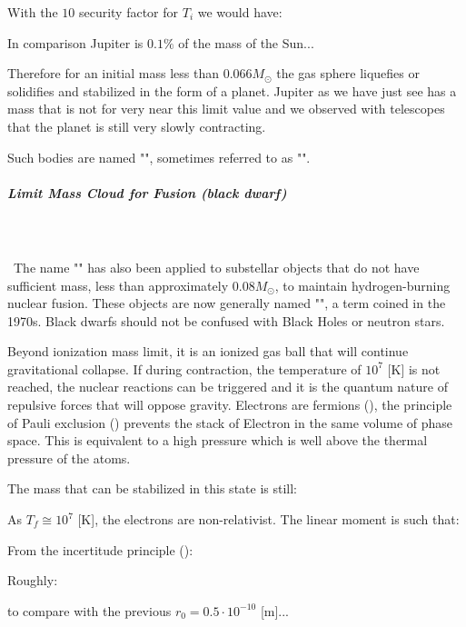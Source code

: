 	With the $10$ security factor for $T_i$ we would have:
	
	In comparison Jupiter is $0.1\%$ of the mass of the Sun...
	
	Therefore for an initial mass less than $0.066 M_\odot $ the gas sphere liquefies or solidifies and stabilized in the form of a planet. Jupiter as we have just see has a mass that is not for very near this limit value and we observed with telescopes that the planet is still very slowly contracting. 
	
	Such bodies are named "", sometimes referred to as "".
	
	\pagebreak
	\subparagraph{Limit Mass Cloud for Fusion (black dwarf)}\mbox{}\\\\\
	The name "" has also been applied to substellar objects that do not have sufficient mass, less than approximately $0.08 M_\odot$, to maintain hydrogen-burning nuclear fusion. These objects are now generally named "", a term coined in the 1970s. Black dwarfs should not be confused with Black Holes or neutron stars.
	
	Beyond ionization mass limit, it is an ionized gas ball that will continue gravitational collapse. If during contraction, the temperature of $10^ 7$ [K] is not reached, the nuclear reactions can be triggered and it is the quantum nature of repulsive forces that will oppose gravity. Electrons are fermions (), the principle of Pauli exclusion () prevents the stack of Electron in the same volume of phase space. This is equivalent to a high pressure which is well above the thermal pressure of the atoms.
	
	The mass that can be stabilized in this state is still:
	
	As $T_f\cong 10^7$ [K], the electrons are non-relativist. The linear moment is such that:
	
	From the incertitude principle ():
	
	Roughly:
	
	to compare with the previous $r_0=0.5\cdot 10^{-10}$ [m]...
	
